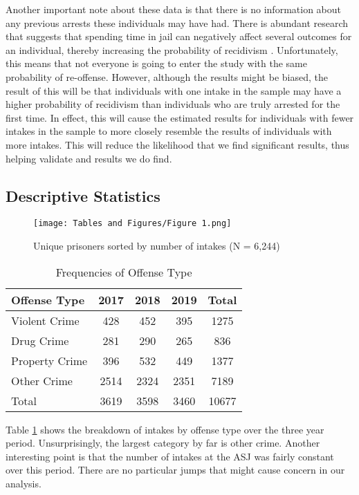 \documentclass{article}
\begin{document}
Another important note about these data is that there is no information about any previous arrests these individuals may have had. There is abundant research that suggests that spending time in jail can negatively affect several outcomes for an individual, thereby increasing the probability of recidivism \parencite{gendreau}. Unfortunately, this means that not everyone is going to enter the study with the same probability of re-offense. However, although the results might be biased, the result of this will be that individuals with one intake in the sample may have a higher probability of recidivism than individuals who are truly arrested for the first time. In effect, this will cause the estimated results for individuals with fewer intakes in the sample to more closely resemble the results of individuals with more intakes. This will reduce the likelihood that we find significant results, thus helping validate and results we do find. 

\subsection{Descriptive Statistics}
\begin{figure}[h]
    \centering
    \texttt{[image: Tables and Figures/Figure 1.png]}
    \caption{Unique prisoners sorted by number of intakes (N = 6,244)}
    \label{fig1}
\end{figure}

\begin{table}[h]
\centering
\begin{tabular}{lcccc}
\hline
    Offense Type      &    2017 & 2018 & 2019  & Total\\ \hline
Violent Crime           &         428 & 452 & 395 & 1275\\
Drug Crime           &         281 & 290 & 265 & 836\\
Property Crime          &         396 & 532 & 449 & 1377 \\
Other Crime           &        2514 & 2324 & 2351 & 7189\\ \hline
Total       &        3619 & 3598 & 3460 & 10677\\
\end{tabular}
\caption{Frequencies of Offense Type}
\label{tab1}
\end{table}

Table \ref{tab1} shows the breakdown of intakes by offense type over the three year period. Unsurprisingly, the largest category by far is other crime. Another interesting point is that the number of intakes at the ASJ was fairly constant over this period. There are no particular jumps that might cause concern in our analysis.  
\end{document}

